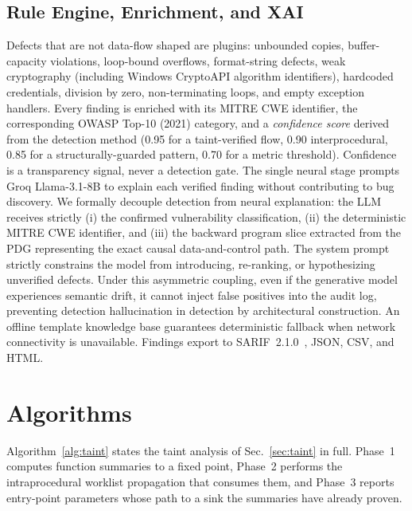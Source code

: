 \documentclass[10pt,conference]{IEEEtran}
\begin{document}
\subsection{Rule Engine, Enrichment, and XAI}
Defects that are not data-flow shaped are plugins: unbounded copies,
buffer-capacity violations, loop-bound overflows, format-string defects,
weak cryptography (including Windows CryptoAPI algorithm identifiers),
hardcoded credentials, division by zero, non-terminating loops, and empty
exception handlers. Every finding is enriched with its MITRE CWE identifier,
the corresponding OWASP Top-10 (2021) category, and a \emph{confidence score}
derived from the detection method (0.95 for a taint-verified flow, 0.90
interprocedural, 0.85 for a structurally-guarded pattern, 0.70 for a
metric threshold). Confidence is a transparency signal, never a detection
gate. The single neural stage prompts Groq Llama-3.1-8B to explain each
verified finding without contributing to bug discovery. We formally decouple
detection from neural explanation: the LLM receives strictly (i) the confirmed
vulnerability classification, (ii) the deterministic MITRE CWE identifier, and
(iii) the backward program slice extracted from the PDG representing the exact
causal data-and-control path. The system prompt strictly constrains the model
from introducing, re-ranking, or hypothesizing unverified defects. Under this
asymmetric coupling, even if the generative model experiences semantic drift,
it cannot inject false positives into the audit log, preventing detection hallucination in detection by architectural construction. An offline template
knowledge base guarantees deterministic fallback when network connectivity is
unavailable. Findings export to SARIF~2.1.0~\cite{sarif}, JSON, CSV, and HTML.

\section{Algorithms}
\label{sec:algo}
Algorithm~\ref{alg:taint} states the taint analysis of Sec.~\ref{sec:taint} in
full. Phase~1 computes function summaries to a fixed point, Phase~2 performs
the intraprocedural worklist propagation that consumes them, and Phase~3
reports entry-point parameters whose path to a sink the summaries have
already proven.
\end{document}
